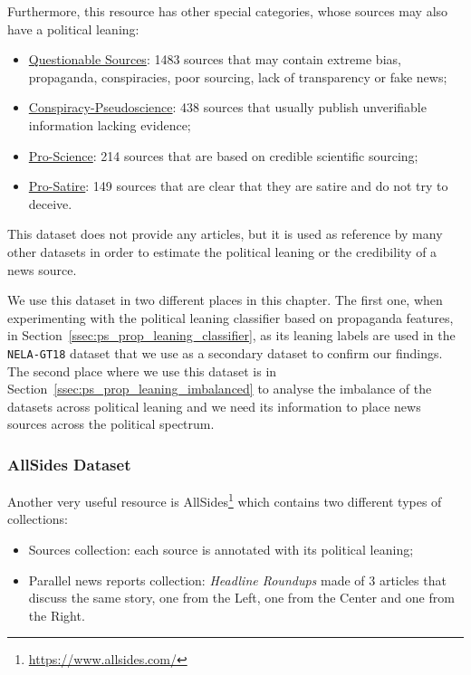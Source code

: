 Furthermore, this resource has other special categories, whose sources may also have a political leaning:

\begin{itemize}
    \item \href{https://mediabiasfactcheck.com/fake-news/}{Questionable Sources}: 1483 sources that may contain extreme bias, propaganda, conspiracies, poor sourcing, lack of transparency or fake news;
    \item \href{https://mediabiasfactcheck.com/conspiracy/}{Conspiracy-Pseudoscience}: 438 sources that usually publish unverifiable information lacking evidence;
    \item \href{https://mediabiasfactcheck.com/pro-science/}{Pro-Science}: 214 sources that are based on credible scientific sourcing;
    \item \href{https://mediabiasfactcheck.com/satire/}{Pro-Satire}: 149 sources that are clear that they are satire and do not try to deceive.
\end{itemize}

This dataset does not provide any articles, but it is used as reference by many other datasets in order to estimate the political leaning or the credibility of a news source.

We use this dataset in two different places in this chapter.
The first one, when experimenting with the political leaning classifier based on propaganda features, in Section~\ref{ssec:ps_prop_leaning_classifier}, as its leaning labels are used in the \texttt{NELA-GT18} dataset that we use as a secondary dataset to confirm our findings.
The second place where we use this dataset is in Section~\ref{ssec:ps_prop_leaning_imbalanced} to analyse the imbalance of the datasets across political leaning and we need its information to place news sources across the political spectrum.

\subsubsection{AllSides Dataset}

Another very useful resource is AllSides\footnote{\url{https://www.allsides.com/}} which contains two different types of collections:

\begin{itemize}
    \item Sources collection: each source is annotated with its political leaning;
    \item Parallel news reports collection: \emph{Headline Roundups\texttrademark} made of 3 articles that discuss the same story, one from the Left, one from the Center and one from the Right.
\end{itemize}

